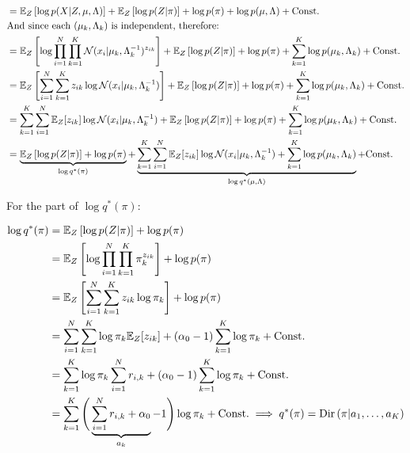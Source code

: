 \documentclass{article}
\def\C{\text{Const.}}
\begin{document}
\begin{equation}
\begin{split}
    &= \E_{Z} \left[ \log p (X | Z, \mu, \Lambda)  \right] + \E_{Z} \left[ \log p ( Z | \pi)  \right] + \log p (\pi) + \log p ( \mu, \Lambda) + \C \\
    &\text{And since each }  ( \mu_k, \Lambda_k) \text{ is independent, therefore:} \\
    &= \E_{Z} \left[ \log  \prod^N_{i=1} \prod^K_{k=1} \mathcal{N}(x_i | \mu_{k}, \Lambda_{k}^{-1})^{z_{ik}}  \right] + \E_{Z} \left[ \log p ( Z | \pi)  \right] + \log p (\pi) + \sum^K_{k=1} \log p ( \mu_k, \Lambda_k) + \C \\
    &= \E_{Z} \left[  \sum^N_{i=1} \sum^K_{k=1} z_{ik} \log \mathcal{N}(x_i | \mu_{k}, \Lambda_{k}^{-1})  \right] + \E_{Z} \left[ \log p ( Z | \pi)  \right] + \log p (\pi) + \sum^K_{k=1} \log p ( \mu_k, \Lambda_k) + \C\\
     &=  \sum^K_{k=1} \sum^N_{i=1} \E_{Z}[ z_{ik}] \log \mathcal{N}(x_i | \mu_{k}, \Lambda_{k}^{-1})  + \E_{Z} \left[ \log p ( Z | \pi)  \right] + \log p (\pi) + \sum^K_{k=1} \log p ( \mu_k, \Lambda_k) + \C\\
     &= \underbrace{ \E_{Z} \left[ \log p ( Z | \pi)  \right] + \log p (\pi)}_{\log q^*(\pi)} + \underbrace{ \sum^K_{k=1} \sum^N_{i=1} \E_{Z}[ z_{ik}] \log \mathcal{N}(x_i | \mu_{k}, \Lambda_{k}^{-1})  +  \sum^K_{k=1} \log p ( \mu_k, \Lambda_k)}_{\log q^*(\mu,\Lambda)} + \C\\
\end{split}
\end{equation}

For the part of $\log q^*(\pi)$:

\begin{equation}
\begin{split}
\log q^*(\pi) &= \E_{Z} \left[ \log p ( Z | \pi)  \right] + \log p (\pi)\\
&= \E_{Z} \left[  \log \prod^N_{i=1} \prod^K_{k=1} \pi^{z_{ik}}_k \right] + \log p (\pi)\\
&= \E_{Z} \left[   \sum^N_{i=1} \sum^K_{k=1} z_{ik} \log \pi_k \right] + \log p (\pi)\\
&=  \sum^N_{i=1} \sum^K_{k=1} \log \pi_k  \E_{Z} [z_{ik}] + (\alpha_0 -1)  \sum_{k=1}^K \log \pi_k + \C \\
&=  \sum^K_{k=1} \log \pi_k   \sum_{i=1}^N r_{i,k} + (\alpha_0 -1)  \sum_{k=1}^K \log \pi_k + \C \\
&=  \sum^K_{k=1} \Bigg( \underbrace{ \sum_{i=1}^N r_{i,k} + \alpha_0}_{a_k} -1 \Bigg) \log \pi_k  + \C
\implies q^*(\pi) = \text{Dir} \left( \pi | a_1, \dots, a_K \right)
\end{split}
\end{equation}
\end{document}
